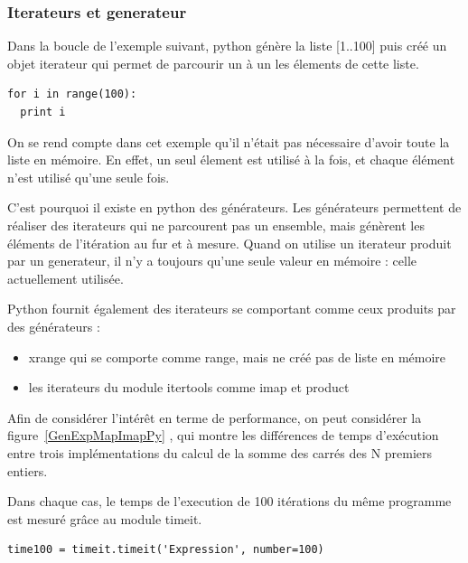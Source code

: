 \documentclass[a4paper]{article}
\begin{document}
\subsubsection{Iterateurs et generateur}

Dans la boucle de l'exemple suivant, python génère la liste  [1..100] puis créé un objet iterateur qui permet de parcourir un à un les élements de cette liste.

\begin{verbatim}
for i in range(100):
  print i
\end{verbatim}

On se rend compte dans cet exemple qu'il n'était pas nécessaire d'avoir toute la liste en mémoire. En effet, un seul élement est utilisé à la fois, et chaque élément n'est utilisé qu'une seule fois.

C'est pourquoi il existe en python des générateurs. Les générateurs permettent de réaliser des iterateurs qui ne parcourent pas un ensemble, mais génèrent les éléments de l'itération au fur et à mesure. Quand on utilise un iterateur produit par un generateur, il n'y a toujours qu'une seule valeur en mémoire : celle actuellement utilisée.

Python fournit également des iterateurs se comportant comme ceux produits par des générateurs : 

\begin{itemize}
  \item xrange qui se comporte comme range, mais ne créé pas de liste en mémoire
  \item les iterateurs du module itertools comme imap et product
\end{itemize}

Afin de considérer l'intérêt en terme de performance, on peut considérer la figure~\ref{GenExpMapImapPy} , qui montre les différences de temps d'exécution entre trois implémentations du calcul de la somme des carrés des N premiers entiers. 

Dans chaque cas, le temps de l'execution de 100 itérations du même programme est mesuré grâce au module timeit.

\begin{verbatim}
time100 = timeit.timeit('Expression', number=100)
\end{verbatim}
\end{document}
